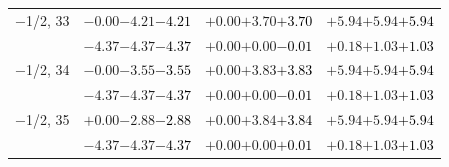 \documentclass[compress]{beamer}
\begin{document}
\begin{frame}
\begin{tabular}{r | c | c | c}
$-$1/2, 33 & $-0.00$\hspace{0.1 cm}$-4.21$\hspace{0.1 cm}\textcolor{black}{$-4.21$} & $+0.00$\hspace{0.1 cm}$+3.70$\hspace{0.1 cm}\textcolor{black}{$+3.70$} & $+5.94$\hspace{0.1 cm}$+5.94$\hspace{0.1 cm}\textcolor{black}{$+5.94$} \\
           & $-4.37$\hspace{0.1 cm}$-4.37$\hspace{0.1 cm}\textcolor{black}{$-4.37$} & $+0.00$\hspace{0.1 cm}$+0.00$\hspace{0.1 cm}\textcolor{black}{$-0.01$} & $+0.18$\hspace{0.1 cm}$+1.03$\hspace{0.1 cm}\textcolor{black}{$+1.03$} \\
$-$1/2, 34 & $-0.00$\hspace{0.1 cm}$-3.55$\hspace{0.1 cm}\textcolor{black}{$-3.55$} & $+0.00$\hspace{0.1 cm}$+3.83$\hspace{0.1 cm}\textcolor{black}{$+3.83$} & $+5.94$\hspace{0.1 cm}$+5.94$\hspace{0.1 cm}\textcolor{black}{$+5.94$} \\
           & $-4.37$\hspace{0.1 cm}$-4.37$\hspace{0.1 cm}\textcolor{black}{$-4.37$} & $+0.00$\hspace{0.1 cm}$+0.00$\hspace{0.1 cm}\textcolor{black}{$-0.01$} & $+0.18$\hspace{0.1 cm}$+1.03$\hspace{0.1 cm}\textcolor{black}{$+1.03$} \\
$-$1/2, 35 & $+0.00$\hspace{0.1 cm}$-2.88$\hspace{0.1 cm}\textcolor{black}{$-2.88$} & $+0.00$\hspace{0.1 cm}$+3.84$\hspace{0.1 cm}\textcolor{black}{$+3.84$} & $+5.94$\hspace{0.1 cm}$+5.94$\hspace{0.1 cm}\textcolor{black}{$+5.94$} \\
           & $-4.37$\hspace{0.1 cm}$-4.37$\hspace{0.1 cm}\textcolor{black}{$-4.37$} & $+0.00$\hspace{0.1 cm}$+0.00$\hspace{0.1 cm}\textcolor{black}{$+0.01$} & $+0.18$\hspace{0.1 cm}$+1.03$\hspace{0.1 cm}\textcolor{black}{$+1.03$} \\

\end{tabular}
\end{frame}
\end{document}
